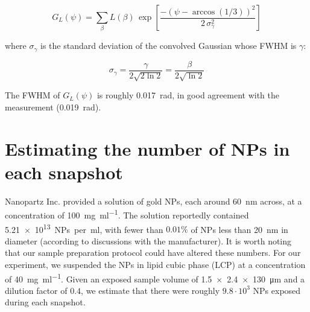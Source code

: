 \documentclass [12pt,fleqn]{article}
\def \be {\begin{equation}}
\def \ee {\end{equation}}
\begin{document}
\be
G_L(\psi) = \sum_\beta L(\beta) \,\exp \left [ \frac{-\left( \psi - \arccos(1/3) \right)^2}  {2\,\sigma^2_{\gamma}}  \right ]
\ee

where $\sigma_\gamma$ is the standard deviation of the convolved Gaussian whose FWHM is $\gamma$:

\be
\sigma_{\gamma} = \frac{\gamma} {2\sqrt{2\ln{2} }} = \frac{\beta} {2\sqrt{\ln{2} }} 
\ee

The FWHM of $G_L(\psi)$ is roughly \SI{0.017}{\radian}, in good agreement with the measurement (\SI{0.019}{\radian}). 

\section{Estimating the number of NPs in each snapshot} \label{number_of_NPs}
Nanopartz Inc. provided a solution of gold NPs, each around \SI{60}{\nano \meter} across, at a concentration of \SI{100}{\mg\per\ml}. The solution reportedly contained \SI{5.21e13}{NPs per \ml}, with fewer than $0.01\%$ of NPs less than \SI{20}{\nano \meter} in diameter (according to discussions with the manufacturer). It is worth noting that our sample preparation protocol could have altered these numbers. For our experiment, we suspended the NPs in lipid cubic phase (LCP) at a concentration of \SI{40}{\mg\per\ml}. Given an exposed sample volume of \SI{1.5x2.4x 130}{\micro \meter} and a dilution factor of $0.4$, we estimate that there were roughly $9.8\cdot 10^3$ NPs exposed during each snapshot. 
\end{document}
